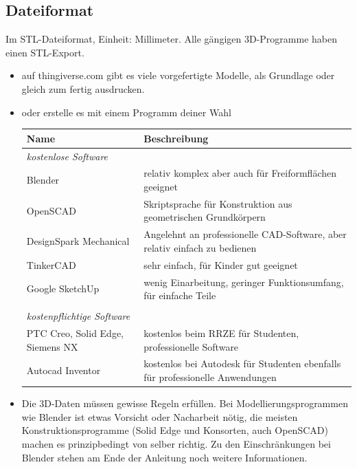\documentclass{\basedir/fablab-document}
\begin{document}
\subsection{Dateiformat}

Im STL-Dateiformat, Einheit: Millimeter. Alle gängigen 3D-Programme haben einen STL-Export.

\begin{itemize}
\item auf thingiverse.com gibt es viele vorgefertigte Modelle, als
Grundlage oder gleich zum fertig ausdrucken.
\item oder erstelle es mit einem Programm deiner Wahl
\begin{table}[H]
\centering
\begin{tabularx}{\textwidth}{|l|X|}
\hline \textbf{Name} & \textbf{Beschreibung} \\
\hline \textit{kostenlose Software} &  \\ 
\hline Blender & relativ komplex aber auch für Freiformflächen geeignet  \\ 
\hline OpenSCAD & Skriptsprache für Konstruktion aus geometrischen Grundkörpern \\ 
\hline DesignSpark Mechanical & Angelehnt an professionelle CAD-Software, aber relativ einfach zu bedienen  \\ 
\hline TinkerCAD & sehr einfach, für Kinder gut geeignet  \\ 
\hline Google SketchUp & wenig Einarbeitung, geringer Funktionsumfang, für einfache Teile \\
\hline & \\
\hline \textit{kostenpflichtige Software} & \\
\hline PTC Creo, Solid Edge, Siemens NX & kostenlos beim RRZE für Studenten, professionelle Software \\
\hline Autocad Inventor & kostenlos bei Autodesk für Studenten ebenfalls für professionelle Anwendungen \\
\hline 
\end{tabularx} 
\end{table}
\item Die 3D-Daten müssen gewisse Regeln erfüllen. Bei Modellierungsprogrammen wie Blender ist etwas Vorsicht oder Nacharbeit nötig, die meisten Konstruktionsprogramme (Solid Edge und Konsorten, auch OpenSCAD) machen es prinzipbedingt von selber richtig. Zu den Einschränkungen bei Blender stehen am Ende der Anleitung noch weitere Informationen.
\end{itemize}
\end{document}
